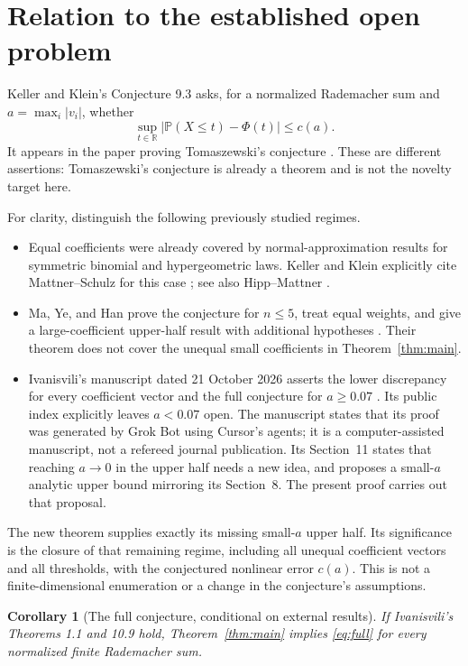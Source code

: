 \documentclass[11pt]{article}
\newtheorem{corollary}[theorem]{Corollary}
\newcommand{\Pp}{\mathbb P}
\newcommand{\R}{\mathbb R}
\begin{document}
\section{Relation to the established open problem}\label{sec:relation}

Keller and Klein's Conjecture 9.3 asks, for a normalized Rademacher sum and
$a=\max_i|v_i|$, whether
\begin{equation}\label{eq:full}
 \sup_{t\in\R}\big|\Pp(X\le t)-\Phi(t)\big|\le c(a).
\end{equation}
It appears in the paper proving Tomaszewski's conjecture \cite{KK}. These are
different assertions: Tomaszewski's conjecture is already a theorem and is not
the novelty target here.

For clarity, distinguish the following previously studied regimes.
\begin{itemize}
\item Equal coefficients were already covered by normal-approximation results
for symmetric binomial and hypergeometric laws. Keller and Klein explicitly
cite Mattner--Schulz for this case \cite{MS}; see also Hipp--Mattner \cite{HM}.
\item Ma, Ye, and Han prove the conjecture for $n\le5$, treat equal weights,
and give a large-coefficient upper-half result with additional hypotheses
\cite{MYH}. Their theorem does not cover the unequal small coefficients in
Theorem~\ref{thm:main}.
\item Ivanisvili's manuscript dated 21 October 2026 asserts the lower
discrepancy for every coefficient vector and the full conjecture for
$a\ge0.07$ \cite{I}. Its public index explicitly leaves $a<0.07$ open.
The manuscript states that its proof was generated by Grok Bot using Cursor's
agents; it is a computer-assisted manuscript, not a refereed journal
publication. Its Section~11 states that reaching $a\to0$ in the upper half
needs a new idea, and proposes a small-$a$ analytic upper bound mirroring its
Section~8. The present proof carries out that proposal.
\end{itemize}

The new theorem supplies exactly its missing small-$a$ upper half. Its
significance is the closure of that remaining regime, including all unequal
coefficient vectors and all thresholds, with the conjectured nonlinear error
$c(a)$. This is not a finite-dimensional enumeration or a change in the
conjecture's assumptions.

\begin{corollary}[The full conjecture, conditional on external results]\label{cor:external}
If Ivanisvili's Theorems 1.1 and 10.9 hold,
Theorem~\ref{thm:main} implies \eqref{eq:full} for every normalized finite
Rademacher sum.
\end{corollary}
\end{document}
